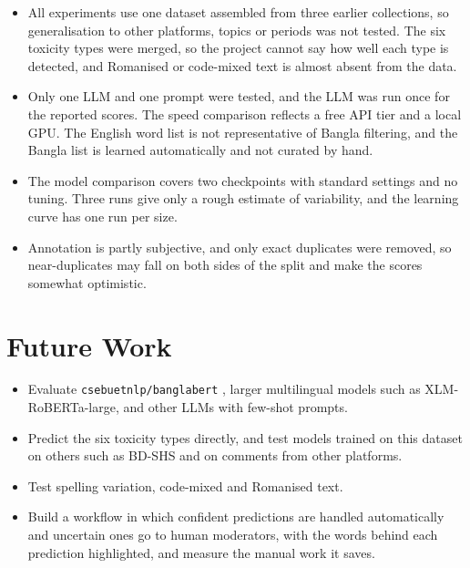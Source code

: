 \begin{itemize}
  \item All experiments use one dataset assembled from three earlier collections, so generalisation to other platforms, topics or periods was not tested. The six toxicity types were merged, so the project cannot say how well each type is detected, and Romanised or code-mixed text is almost absent from the data.
  \item Only one LLM and one prompt were tested, and the LLM was run once for the reported scores. The speed comparison reflects a free API tier and a local GPU. The English word list is not representative of Bangla filtering, and the Bangla list is learned automatically and not curated by hand.
  \item The model comparison covers two checkpoints with standard settings and no tuning. Three runs give only a rough estimate of variability, and the learning curve has one run per size.
  \item Annotation is partly subjective, and only exact duplicates were removed, so near-duplicates may fall on both sides of the split and make the scores somewhat optimistic.
\end{itemize}

\section{Future Work}

\begin{itemize}
  \item Evaluate \texttt{csebuetnlp/banglabert} \cite{bhattacharjee2022banglabert}, larger multilingual models such as XLM-RoBERTa-large, and other LLMs with few-shot prompts.
  \item Predict the six toxicity types directly, and test models trained on this dataset on others such as BD-SHS \cite{romim2022bdshs} and on comments from other platforms.
  \item Test spelling variation, code-mixed and Romanised text.
  \item Build a workflow in which confident predictions are handled automatically and uncertain ones go to human moderators, with the words behind each prediction highlighted, and measure the manual work it saves.
\end{itemize}
